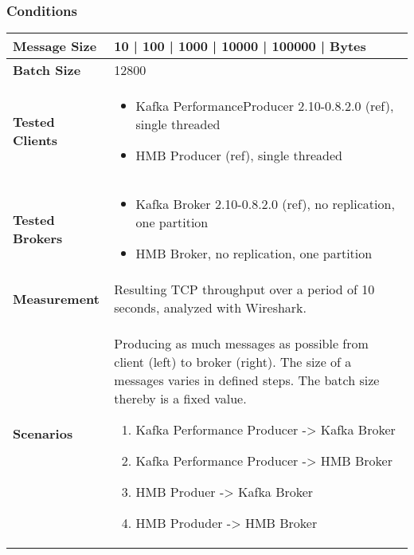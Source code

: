 \subsubsection{Conditions}
\begin{table}[H]
\begin{tabular}{|l| p{12cm}|} \hline
{\bf Message Size}   & 10 | 100 | 1000 | 10000 | 100000 | Bytes \\ \hline
{\bf Batch Size}     & 12800 \\ \hline
{\bf Tested Clients} &
    \begin{itemize}
        \item Kafka PerformanceProducer 2.10-0.8.2.0 (ref), single threaded
        \item HMB Producer (ref), single threaded
    \end{itemize}\\ \hline
{\bf Tested Brokers} &
    \begin{itemize}
        \item Kafka Broker 2.10-0.8.2.0 (ref), no replication, one partition
        \item HMB Broker, no replication, one partition
    \end{itemize}\\ \hline
{\bf Measurement} & Resulting TCP throughput over a period of 10 seconds, analyzed with
    Wireshark. \\ \hline
{\bf Scenarios} & Producing as much messages as possible from client (left) to broker (right).
    The size of a messages varies in defined steps. The batch size thereby is a fixed value. 
  \begin{enumerate}
        \item Kafka Performance Producer -> Kafka Broker
        \item Kafka Performance Producer -> HMB Broker
        \item HMB Produer -> Kafka Broker
        \item HMB Produder -> HMB Broker
    \end{enumerate} \\ \hline
\end{tabular}
\end{table}

